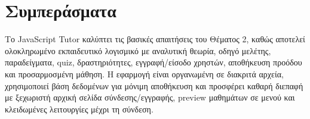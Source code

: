 \documentclass[a4paper]{article}
\newcommand{\textlatin}[1]{\textenglish{#1}}
\begin{document}
\section{Συμπεράσματα}

Το \textlatin{JavaScript Tutor} καλύπτει τις βασικές απαιτήσεις του Θέματος 2, καθώς αποτελεί ολοκληρωμένο εκπαιδευτικό λογισμικό με αναλυτική θεωρία, οδηγό μελέτης, παραδείγματα, quiz, δραστηριότητες, εγγραφή/είσοδο χρηστών, αποθήκευση προόδου και προσαρμοσμένη μάθηση. Η εφαρμογή είναι οργανωμένη σε διακριτά αρχεία, χρησιμοποιεί βάση δεδομένων για μόνιμη αποθήκευση και προσφέρει καθαρή διεπαφή με ξεχωριστή αρχική σελίδα σύνδεσης/εγγραφής, preview μαθημάτων σε μενού και κλειδωμένες λειτουργίες μέχρι τη σύνδεση.
\end{document}
